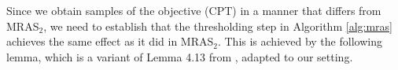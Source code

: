 

Since we obtain samples of the objective (CPT) in a manner that differs from MRAS$_2$, we need to establish that the thresholding step in Algorithm \ref{alg:mras} achieves the same effect as it did in MRAS$_2$. This is achieved by the following lemma, which is a variant of Lemma 4.13 from \cite{chang2013simulation}, adapted to our setting. 

